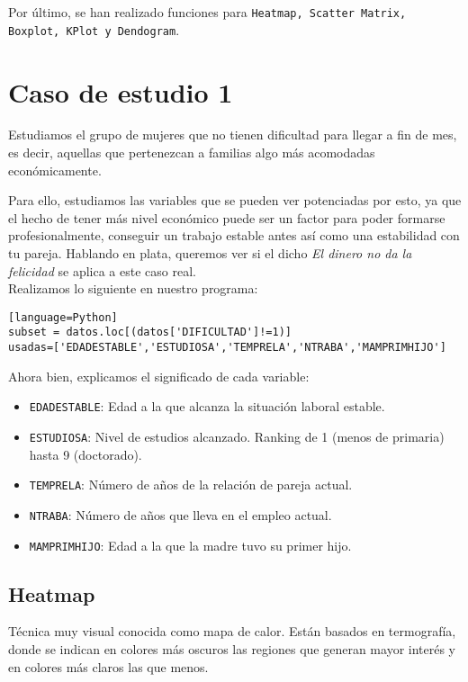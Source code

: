 	Por último, se han realizado funciones para \texttt{Heatmap, Scatter Matrix, Boxplot, KPlot y Dendogram}.
	
	
	
	
	\section{Caso de estudio 1}
	
	Estudiamos el grupo de mujeres que no tienen dificultad para llegar a fin de mes, es decir, aquellas que pertenezcan a familias algo más acomodadas económicamente. 
	
	Para ello, estudiamos las variables que se pueden ver potenciadas por esto, ya que el hecho de tener más nivel económico puede ser un factor para poder formarse  profesionalmente, conseguir un trabajo estable antes así como una estabilidad con tu pareja. 
	Hablando en plata, queremos ver si el dicho \textit{El dinero no da la felicidad} se aplica a este caso real. \\
	
	
	Realizamos lo siguiente en nuestro programa:
	\begin{lstlisting}[frame=single][language=Python]
subset = datos.loc[(datos['DIFICULTAD']!=1)]
usadas=['EDADESTABLE','ESTUDIOSA','TEMPRELA','NTRABA','MAMPRIMHIJO']
	\end{lstlisting}
	
	\newpage
	Ahora bien, explicamos el significado de cada variable:
	
	\begin{itemize}
		\item \texttt{EDADESTABLE}: Edad a la que alcanza la situación laboral estable.
		\item \texttt{ESTUDIOSA}: Nivel de estudios alcanzado. Ranking de 1 (menos de primaria) hasta 9 (doctorado).
		\item \texttt{TEMPRELA}: Número de años de la relación de pareja actual.
		\item \texttt{NTRABA}: Número de años que lleva en el empleo actual.
		\item \texttt{MAMPRIMHIJO}: Edad a la que la madre tuvo su primer hijo. 
	\end{itemize}
	
	
	\subsection{Heatmap}
	
	Técnica muy visual conocida como mapa de calor. Están basados en termografía,  donde se indican en colores más oscuros las regiones que generan mayor interés y en colores más claros las que menos.
	
